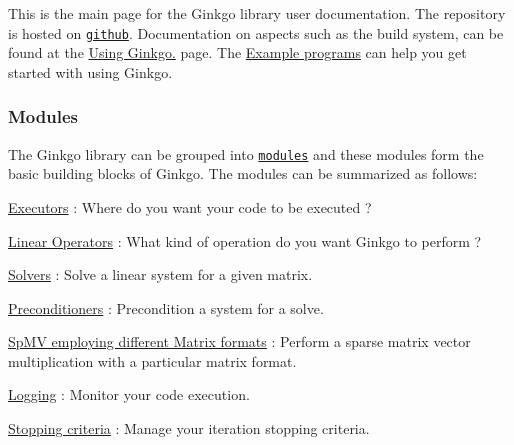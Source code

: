 This is the main page for the Ginkgo library user documentation. The repository is hosted on \href{https://github.com/ginkgo-project/ginkgo}{\tt github}. Documentation on aspects such as the build system, can be found at the \hyperlink{using_ginkgo}{Using Ginkgo.} page. The \hyperlink{Examples}{Example programs} can help you get started with using Ginkgo.

\subsubsection*{Modules}

The Ginkgo library can be grouped into \href{modules.html}{\tt modules} and these modules form the basic building blocks of Ginkgo. The modules can be summarized as follows\+:


\begin{DoxyItemize}
\item \hyperlink{group__Executor}{Executors} \+: Where do you want your code to be executed ?
\item \hyperlink{group__LinOp}{Linear Operators} \+: What kind of operation do you want Ginkgo to perform ?
\begin{DoxyItemize}
\item \hyperlink{group__solvers}{Solvers} \+: Solve a linear system for a given matrix.
\item \hyperlink{group__precond}{Preconditioners} \+: Precondition a system for a solve.
\item \hyperlink{group__mat__formats}{Sp\+MV employing different Matrix formats} \+: Perform a sparse matrix vector multiplication with a particular matrix format.
\end{DoxyItemize}
\item \hyperlink{group__log}{Logging} \+: Monitor your code execution.
\item \hyperlink{group__stop}{Stopping criteria} \+: Manage your iteration stopping criteria. 
\end{DoxyItemize}